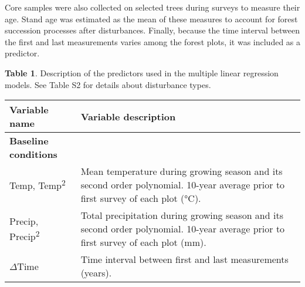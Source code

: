 \documentclass[
  a4paperpaper,
]{article}
\begin{document}
Core samples were also collected on selected trees during surveys to
measure their age. Stand age was estimated as the mean of these measures
to account for forest succession processes after disturbances. Finally,
because the time interval between the first and last measurements varies
among the forest plots, it was included as a predictor.

\textbf{Table 1}. Description of the predictors used in the multiple
linear regression models. See Table S2 for details about disturbance
types.

\begin{longtable}[]{@{}ll@{}}
\toprule
\begin{minipage}[b]{0.22\columnwidth}\raggedright
Variable name\strut
\end{minipage} & \begin{minipage}[b]{0.72\columnwidth}\raggedright
Variable description\strut
\end{minipage}\tabularnewline
\midrule
\endhead
\begin{minipage}[t]{0.22\columnwidth}\raggedright
\textbf{Baseline conditions}\strut
\end{minipage} & \begin{minipage}[t]{0.72\columnwidth}\raggedright
\strut
\end{minipage}\tabularnewline
\begin{minipage}[t]{0.22\columnwidth}\raggedright
Temp, Temp\textsuperscript{2}\strut
\end{minipage} & \begin{minipage}[t]{0.72\columnwidth}\raggedright
Mean temperature during growing season and its second order polynomial.
10-year average prior to first survey of each plot (°C).\strut
\end{minipage}\tabularnewline
\begin{minipage}[t]{0.22\columnwidth}\raggedright
Precip, Precip\textsuperscript{2}\strut
\end{minipage} & \begin{minipage}[t]{0.72\columnwidth}\raggedright
Total precipitation during growing season and its second order
polynomial. 10-year average prior to first survey of each plot
(mm).\strut
\end{minipage}\tabularnewline
\begin{minipage}[t]{0.22\columnwidth}\raggedright
\(\Delta\)Time\strut
\end{minipage} & \begin{minipage}[t]{0.72\columnwidth}\raggedright
Time interval between first and last measurements (years).\strut

\end{minipage}
\end{longtable}
\end{document}
